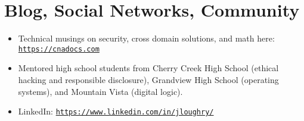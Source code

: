 \section*{Blog, Social Networks, Community}
\vspace{-2mm}

\begin{itemize}
    \item Technical musings on security, cross domain solutions, and math
        here:
        \href{https://cnadocs.com}{\nolinkurl{https://cnadocs.com}}\vspace{-1mm}
    \item Mentored high school students from Cherry Creek High School
        (ethical hacking and responsible disclosure), Grandview High School
        (operating systems), and Mountain Vista (digital logic).\vspace{-1mm}
    \item LinkedIn:
        \href{https://www.linkedin.com/in/jloughry/}{\nolinkurl{https://www.linkedin.com/in/jloughry/}}
\end{itemize}

